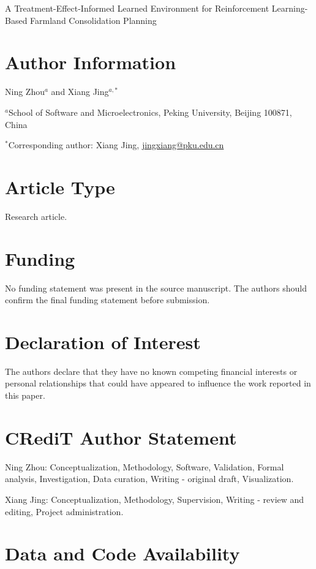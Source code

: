 \documentclass[11pt]{article}
\begin{document}
\begin{center}
{\Large A Treatment-Effect-Informed Learned Environment for Reinforcement Learning-Based Farmland Consolidation Planning}
\end{center}

\section*{Author Information}

Ning Zhou$^{a}$ and Xiang Jing$^{a,*}$

\noindent $^{a}$School of Software and Microelectronics, Peking University, Beijing 100871, China

\noindent $^{*}$Corresponding author: Xiang Jing, \href{mailto:jingxiang@pku.edu.cn}{jingxiang@pku.edu.cn}

\section*{Article Type}

Research article.

\section*{Funding}

No funding statement was present in the source manuscript. The authors should confirm the final funding statement before submission.

\section*{Declaration of Interest}

The authors declare that they have no known competing financial interests or personal relationships that could have appeared to influence the work reported in this paper.

\section*{CRediT Author Statement}

Ning Zhou: Conceptualization, Methodology, Software, Validation, Formal analysis, Investigation, Data curation, Writing - original draft, Visualization.

Xiang Jing: Conceptualization, Methodology, Supervision, Writing - review and editing, Project administration.

\section*{Data and Code Availability}
\end{document}
